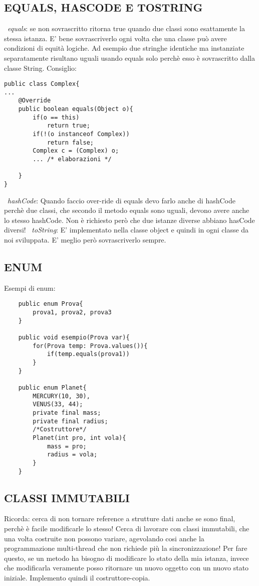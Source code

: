 \subsection{EQUALS, HASCODE E TOSTRING}
\noindent \textbullet\ \textit{equals}: se non sovrascritto ritorna true quando due classi sono esattamente la stessa istanza. E' bene sovrascriverlo ogni volta che una classe può avere condizioni di equità logiche. Ad esempio due stringhe identiche ma instanziate separatamente risultano uguali usando equals solo perchè esso è sovrascritto dalla classe String. Consiglio: 
\begin{lstlisting}
public class Complex{
...
	@Override
	public boolean equals(Object o){
		if(o == this)
			return true;
		if(!(o instanceof Complex))
			return false;
		Complex c = (Complex) o;
		... /* elaborazioni */	

	}
}
\end{lstlisting}
\noindent \textbullet\ \textit{hashCode}: Quando faccio over-ride di equals devo farlo anche di hashCode perchè due classi, che secondo il metodo equals sono uguali, devono avere anche lo stesso hashCode. Non è richiesto però che due istanze diverse abbiano hasCode diversi! 
\textbullet\ \textit{toString}: E' implementato nella classe object e quindi in ogni classe da noi sviluppata. E' meglio però sovrascriverlo sempre.

\subsection{ENUM}
\noindent Esempi di enum:
\begin{lstlisting}
	public enum Prova{
		prova1, prova2, prova3
	}
	
	public void esempio(Prova var){
		for(Prova temp: Prova.values()){
			if(temp.equals(prova1))
		}
	}
	
	public enum Planet{
		MERCURY(10, 30),
		VENUS(33, 44);
		private final mass;
		private final radius;
		/*Costruttore*/
		Planet(int pro, int vola){
			mass = pro;
			radius = vola;
		}
	}
\end{lstlisting}

\subsection{CLASSI IMMUTABILI}
\noindent Ricorda: cerca di non tornare reference a strutture dati anche se sono final, perchè è facile modificarle lo stesso! Cerca di lavorare con classi immutabili, che una volta costruite non possono variare, agevolando cosi anche la programmazione multi-thread che non richiede più la sincronizzazione! Per fare questo, se un metodo ha bisogno di modificare lo stato della mia istanza, invece che modificarla veramente posso ritornare un nuovo oggetto con un nuovo stato iniziale. Implemento quindi il costruttore-copia.

